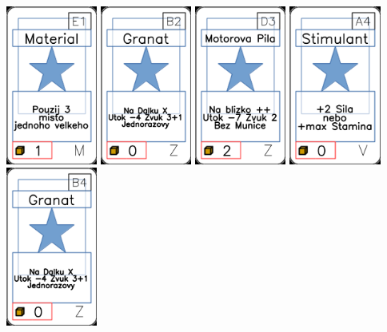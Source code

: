\documentclass[a4paper]{article}
\begin{document}
	\includegraphics[width=3.0cm]{img-1_50}
	\includegraphics[width=3.0cm]{img-1_96}
	\includegraphics[width=3.0cm]{img-1_107}
	\includegraphics[width=3.0cm]{img-1_63}
	\includegraphics[width=3.0cm]{img-1_98}
\end{document}
